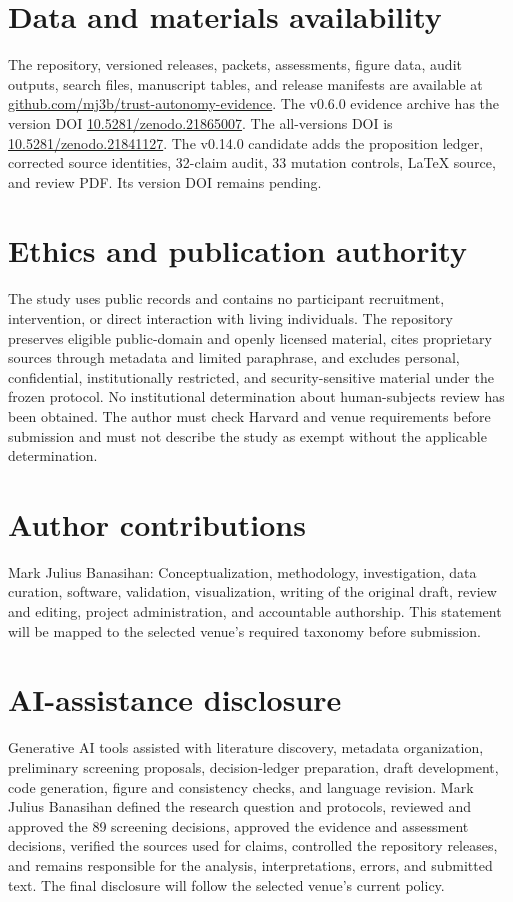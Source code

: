 \documentclass[11pt]{article}
\begin{document}
\section*{Data and materials availability}
The repository, versioned releases, packets, assessments, figure data, audit outputs, search files, manuscript tables, and release manifests are available at \href{https://github.com/mj3b/trust-autonomy-evidence}{github.com/mj3b/trust-autonomy-evidence}. The v0.6.0 evidence archive has the version DOI \href{https://doi.org/10.5281/zenodo.21865007}{10.5281/zenodo.21865007}. The all-versions DOI is \href{https://doi.org/10.5281/zenodo.21841127}{10.5281/zenodo.21841127}. The v0.14.0 candidate adds the proposition ledger, corrected source identities, 32-claim audit, 33 mutation controls, LaTeX source, and review PDF. Its version DOI remains pending.
\FloatBarrier
\section*{Ethics and publication authority}
The study uses public records and contains no participant recruitment, intervention, or direct interaction with living individuals. The repository preserves eligible public-domain and openly licensed material, cites proprietary sources through metadata and limited paraphrase, and excludes personal, confidential, institutionally restricted, and security-sensitive material under the frozen protocol. No institutional determination about human-subjects review has been obtained. The author must check Harvard and venue requirements before submission and must not describe the study as exempt without the applicable determination.
\FloatBarrier
\section*{Author contributions}
Mark Julius Banasihan: Conceptualization, methodology, investigation, data curation, software, validation, visualization, writing of the original draft, review and editing, project administration, and accountable authorship. This statement will be mapped to the selected venue's required taxonomy before submission.
\FloatBarrier
\section*{AI-assistance disclosure}
Generative AI tools assisted with literature discovery, metadata organization, preliminary screening proposals, decision-ledger preparation, draft development, code generation, figure and consistency checks, and language revision. Mark Julius Banasihan defined the research question and protocols, reviewed and approved the 89 screening decisions, approved the evidence and assessment decisions, verified the sources used for claims, controlled the repository releases, and remains responsible for the analysis, interpretations, errors, and submitted text. The final disclosure will follow the selected venue's current policy.
\FloatBarrier
\end{document}
